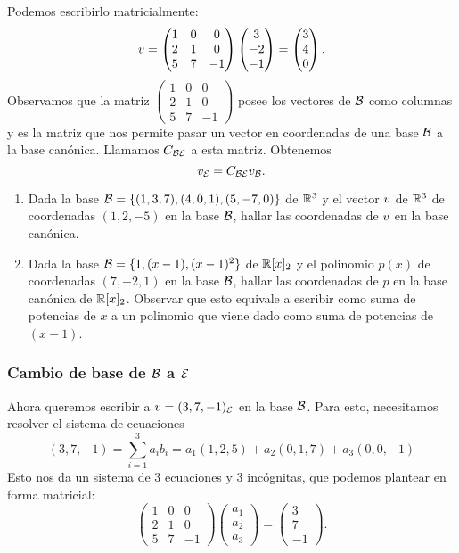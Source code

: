 Podemos escribirlo matricialmente:
$$
\vb = \begin{pmatrix}
1 & 0 & 0 \\
2 & 1 & 0 \\
5 & 7 & -1\end{pmatrix} \begin{pmatrix} 3 \\ -2 \\ -1 \end{pmatrix} =  \begin{pmatrix} 3 \\ 4 \\ 0 \end{pmatrix}.
$$
Observamos que la matriz $\begin{pmatrix} 1 & 0 & 0 \\ 2 & 1 & 0 \\ 5 & 7 & -1 \end{pmatrix}$ posee los vectores de $\mathcal B$ como columnas y es la matriz que nos permite pasar un vector en coordenadas de una base $\mathcal B$ a la base canónica. Llamamos $\Cb_{\B\E}$ a esta matriz. Obtenemos
$$
\vb_\E= \Cb_{\B\E} \vb_\B.
$$

\begin{ejercicio}\leavevmode
\begin{enumerate}
 \item Dada la base $\mathcal B = \{(1,3,7), (4, 0, 1), (5, -7, 0)\}$ de $\mathbb R^3$ y el vector $\vb$ de $\mathbb R^3$ de coordenadas $(1,2,-5)$ en la base $\mathcal B$, hallar las coordenadas de $\vb$ en la base canónica.
\item Dada la base $\mathcal B = \{1, (x-1), (x-1)^2\}$ de $\mathbb R[x]_2$ y el polinomio $p(x)$ de coordenadas $(7, -2, 1)$ en la base $\mathcal B$, hallar las coordenadas de $p$ en la base canónica de $\mathbb R[x]_2$. Observar que esto equivale a escribir como suma de potencias de $x$ a un polinomio que viene dado como suma de potencias de $(x-1)$.
\end{enumerate}
\end{ejercicio}

\subsubsection{Cambio de base de $\mathcal B$ a $\mathcal E$}

Ahora queremos escribir a $\vb = (3,7, -1)_\E$ en la base $\mathcal B$. Para esto, necesitamos resolver el sistema de ecuaciones $$
(3, 7, -1) = \sum_{i=1}^{3} a_i b_i = a_1 (1,2,5) + a_2 (0, 1, 7) + a_3 (0,0,-1)
$$ Esto nos da un sistema de 3 ecuaciones y 3 incógnitas, que podemos plantear en forma matricial:
$$
\begin{pmatrix}
1 & 0 & 0 \\
2 & 1 & 0 \\
5 & 7 & -1
\end{pmatrix} \begin{pmatrix} a_1 \\ a_2 \\a_3 \end{pmatrix}  = \begin{pmatrix} 3 \\ 7 \\ -1 \end{pmatrix}.
$$

